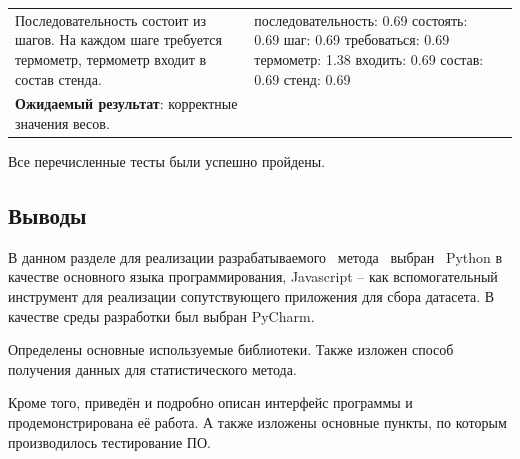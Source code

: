\begin{longtable}{|p{6cm}|p{5cm}|p{4.5cm}|}
	Последовательность состоит из шагов. На каждом шаге требуется термометр, термометр входит в состав стенда. &
	последовательность: 0.69 \newline 
	состоять: 0.69\newline
	шаг: 0.69 \newline
	требоваться: 0.69\newline
	термометр: 1.38\newline
	входить: 0.69 \newline
	состав: 0.69\newline
	стенд: 0.69
	\\
	
	\textbf{Ожидаемый результат}: корректные значения весов. &
	&\\
\end{longtable}

Все перечисленные тесты были успешно пройдены. \newline

\subsection*{Выводы}
В данном разделе для реализации разрабатываемого \, метода \, выбран \, Python в качестве основного языка программирования, Javascript -- как вспомогательный инструмент для реализации сопутствующего приложения для сбора датасета. В качестве среды разработки был выбран PyCharm.

Определены основные используемые библиотеки. Также изложен способ получения данных для статистического метода.

Кроме того, приведён и подробно описан интерфейс программы и продемонстрирована её работа. А также изложены основные пункты, по которым производилось тестирование ПО.
\pagebreak

